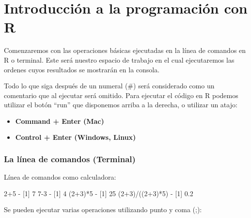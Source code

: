 \documentclass[
]{book}
\newenvironment{Shaded}{\begin{snugshade}}{\end{snugshade}}
\newcommand{\DecValTok}[1]{\textcolor[rgb]{0.00,0.00,0.81}{#1}}
\newcommand{\FloatTok}[1]{\textcolor[rgb]{0.00,0.00,0.81}{#1}}
\newcommand{\NormalTok}[1]{#1}
\newcommand{\SpecialCharTok}[1]{\textcolor[rgb]{0.00,0.00,0.00}{#1}}
\providecommand{\tightlist}{%
  \setlength{\itemsep}{0pt}\setlength{\parskip}{0pt}}
\begin{document}
\hypertarget{introducciuxf3n-a-la-programaciuxf3n-con-r}{%
\chapter{Introducción a la programación con R}\label{introducciuxf3n-a-la-programaciuxf3n-con-r}}

Comenzaremos con las operaciones básicas ejecutadas en la línea de comandos en R o terminal. Este será nuestro espacio de trabajo en el cual ejecutaremos las ordenes cuyos resultados se mostrarán en la consola.

Todo lo que siga después de un numeral (\#) será considerado como un comentario que al ejecutar será omitido. Para ejecutar el código en R podemos utilizar el botón ``run'' que disponemos arriba a la derecha, o utilizar un atajo:

\begin{itemize}
\tightlist
\item
  \textbf{Command + Enter (Mac)}
\item
  \textbf{Control + Enter (Windows, Linux)}
\end{itemize}

\hypertarget{la-luxednea-de-comandos-terminal}{%
\subsection{La línea de comandos (Terminal)}\label{la-luxednea-de-comandos-terminal}}

Línea de comandos como calculadora:

\begin{Shaded}
\begin{Highlighting}[]
\DecValTok{2}\SpecialCharTok{+}\DecValTok{5}
\SpecialCharTok{{-}}\NormalTok{ [}\DecValTok{1}\NormalTok{] }\DecValTok{7}
\DecValTok{7{-}3}
\SpecialCharTok{{-}}\NormalTok{ [}\DecValTok{1}\NormalTok{] }\DecValTok{4}
\NormalTok{(}\DecValTok{2}\SpecialCharTok{+}\DecValTok{3}\NormalTok{)}\SpecialCharTok{*}\DecValTok{5}
\SpecialCharTok{{-}}\NormalTok{ [}\DecValTok{1}\NormalTok{] }\DecValTok{25}
\NormalTok{(}\DecValTok{2}\SpecialCharTok{+}\DecValTok{3}\NormalTok{)}\SpecialCharTok{/}\NormalTok{((}\DecValTok{2}\SpecialCharTok{+}\DecValTok{3}\NormalTok{)}\SpecialCharTok{*}\DecValTok{5}\NormalTok{)}
\SpecialCharTok{{-}}\NormalTok{ [}\DecValTok{1}\NormalTok{] }\FloatTok{0.2}
\end{Highlighting}
\end{Shaded}

Se pueden ejecutar varias operaciones utilizando punto y coma (;):
\end{document}
